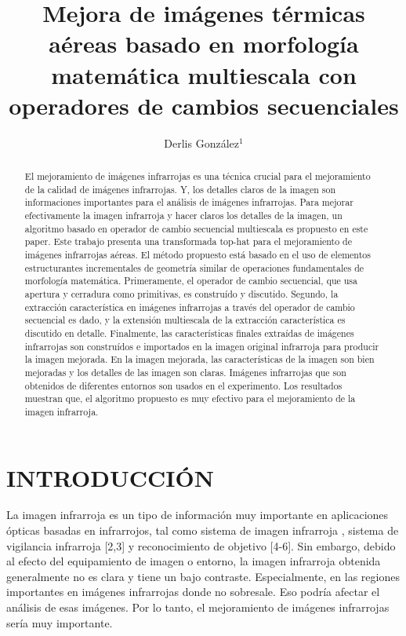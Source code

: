 \documentclass[a4paper, 11 pt, conference]{ieeeconf}      %
\title{\LARGE \bf
Mejora de im\'agenes t\'ermicas a\'ereas basado en morfolog\'ia matem\'atica multiescala con operadores de cambios secuenciales
}
\author{Derlis Gonz\'alez$^{1}$ %
}
\begin{document}
\maketitle
\thispagestyle{empty}
\pagestyle{empty}


\begin{abstract}

El mejoramiento de im\'agenes infrarrojas es una t\'ecnica crucial para el mejoramiento de la calidad de im\'agenes infrarrojas. Y, los detalles claros de la imagen son informaciones importantes para el an\'alisis de im\'agenes infrarrojas. Para mejorar efectivamente la imagen infrarroja y hacer claros los detalles de la imagen, un algoritmo basado en operador de cambio secuencial multiescala es propuesto en este paper. Este trabajo presenta una transformada top-hat para el mejoramiento de im\'agenes infrarrojas a\'ereas. El m\'etodo propuesto est\'a basado en el uso de elementos estructurantes incrementales de geometr\'ia similar de operaciones fundamentales de morfolog\'ia matem\'atica. Primeramente, el operador de cambio secuencial, que usa apertura y cerradura como primitivas, es constru\'ido y discutido. Segundo, la extracci\'on caracter\'istica en im\'agenes infrarrojas a trav\'es del operador de cambio secuencial es dado, y la extensi\'on multiescala de la extracci\'on caracter\'istica es discutido en detalle. Finalmente, las caracter\'isticas finales extra\'idas de im\'agenes infrarrojas son constru\'idos e importados en la imagen original infrarroja para producir la imagen mejorada. En la imagen mejorada, las caracter\'isticas de la imagen son bien mejoradas y los detalles de las imagen son claras. Im\'agenes infrarrojas que son obtenidos de diferentes entornos son usados en el experimento. Los resultados muestran que, el algoritmo propuesto es muy efectivo para el mejoramiento de la imagen infrarroja.

\end{abstract}


\section{INTRODUCCI\'ON}

La imagen infrarroja es un tipo de información muy importante en aplicaciones ópticas basadas en infrarrojos, tal como sistema de imagen infrarroja \cite{c1}, sistema de vigilancia infrarroja [2,3] y reconocimiento de objetivo \cite{c4,c6} [4-6]. Sin embargo, debido al efecto del equipamiento de imagen o entorno, la imagen infrarroja obtenida generalmente no es clara y tiene un bajo contraste. Especialmente, en las regiones importantes en im\'agenes infrarrojas donde no sobresale. Eso podr\'ia afectar el an\'alisis de esas im\'agenes. Por lo tanto, el mejoramiento de im\'agenes infrarrojas ser\'ia muy importante.
\end{document}
